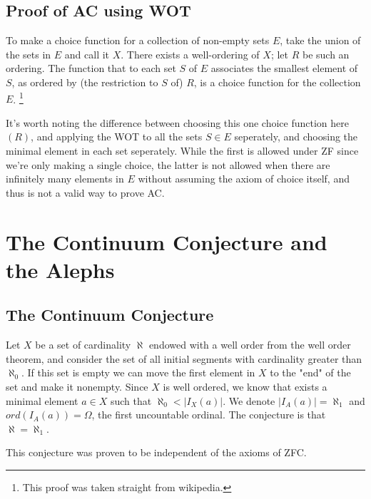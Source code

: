 \documentclass[11pt,a4paper]{article}
\begin{document}
\subsection{Proof of AC using WOT}
To make a choice function for a collection of non-empty sets $E$, 
take the union of the sets in $E$ and call it $X$. There exists a 
well-ordering of $X$; let $R$ be such an ordering. The function that 
to each set $S$ of $E$ associates the smallest element of $S$, 
as ordered by (the restriction to $S$ of) $R$, is a choice function 
for the collection $E$.
\footnote{This proof was taken straight from wikipedia.}

It's worth noting the difference between choosing this one choice function 
here $(R)$, and applying the WOT to all the sets $S\in E$ seperately, 
and choosing the minimal element in each set seperately. 
While the first is allowed under ZF since we're only making a single 
choice, the latter is not allowed when there are infinitely many 
elements in $E$ without assuming the axiom of choice itself, and 
thus is not a valid way to prove AC.

\newpage
	
	\section{The Continuum Conjecture and the Alephs}
	\subsection{The Continuum Conjecture}
	Let $X$ be a set of cardinality $\aleph$ endowed with a well order
	from the well order theorem, and consider the set of all 
	initial segments with cardinality greater than $\aleph_0$. 
	If this set is empty we can move the first element in $X$ to the "end" 
	of the set and make it nonempty. Since $X$ is well ordered, we know that 
	exists a minimal element $a \in X$ such that $\aleph_0 < |I_X(a)|$. 
	We denote $|I_A(a)| = \aleph_1$ and $ord(I_A(a)) = \Omega$, the first
	uncountable ordinal. The conjecture is that $\aleph=\aleph_1$.
	
	\begin{remark}
		This conjecture was proven to be independent of the axioms of ZFC.
	\end{remark}
	
\end{document}
